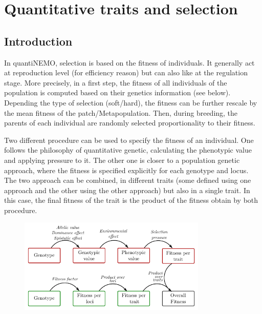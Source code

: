 \documentclass[letterpaper,12pt,oneside]{book}
\begin{document}
\chapter{Quantitative traits and selection}\label{chap:QuantitativeTraitsAndSelection}
\section{Introduction}
In quantiNEMO,  selection is based on the fitness of individuals. It generally act at reproduction level (for efficiency reason) but can also like at the regulation stage. More precisely, in a first step, the fitness of all individuals of the population is computed based on their genetics information (see below). Depending the type of selection (soft/hard), the fitness can be further rescale by the mean fitness of the patch/Metapopulation. Then, during breeding, the parents of each individual are randomly selected proportionality to their fitness.  

Two different procedure can be used to specify the fitness of an individual. One follows the philosophy of quantitative genetic, calculating the phenotypic value and applying pressure to it. The other one is closer to a population genetic approach, where the fitness is specified explicitly for each genotype and locus. The two approach can be combined, in different traits (some defined using one approach and the other using the other approach) but also in a single trait. In this case, the final fitness of the trait is the product of the fitness obtain by both procedure. 
\begin{figure}[h]
	\centering
		\includegraphics[width=0.80\textwidth]{selection.pdf}
	\label{fig:life-cycle}
\end{figure}
\end{document}
